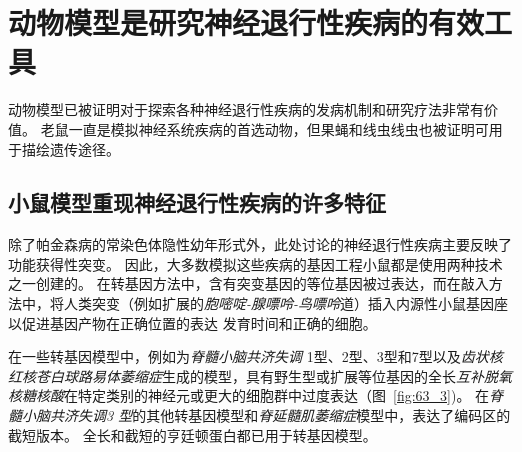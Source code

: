 \section{动物模型是研究神经退行性疾病的有效工具}

动物模型已被证明对于探索各种神经退行性疾病的发病机制和研究疗法非常有价值。
老鼠一直是模拟神经系统疾病的首选动物，但果蝇和线虫线虫也被证明可用于描绘遗传途径。



\subsection{小鼠模型重现神经退行性疾病的许多特征}

除了帕金森病的常染色体隐性幼年形式外，此处讨论的神经退行性疾病主要反映了功能获得性突变。
因此，大多数模拟这些疾病的基因工程小鼠都是使用两种技术之一创建的。
在转基因方法中，含有突变基因的等位基因被过表达，而在敲入方法中，将人类突变（例如扩展的\textit{胞嘧啶-腺嘌呤-鸟嘌呤}道）插入内源性小鼠基因座以促进基因产物在正确位置的表达 发育时间和正确的细胞。


在一些转基因模型中，例如为\textit{脊髓小脑共济失调} 1型、2型、3型和7型以及\textit{齿状核红核苍白球路易体萎缩症}生成的模型，具有野生型或扩展等位基因的全长\textit{互补脱氧核糖核酸}在特定类别的神经元或更大的细胞群中过度表达（图~\ref{fig:63_3})。
在\textit{脊髓小脑共济失调3 型}的其他转基因模型和\textit{脊延髓肌萎缩症}模型中，表达了编码区的截短版本。
全长和截短的亨廷顿蛋白都已用于转基因模型。


